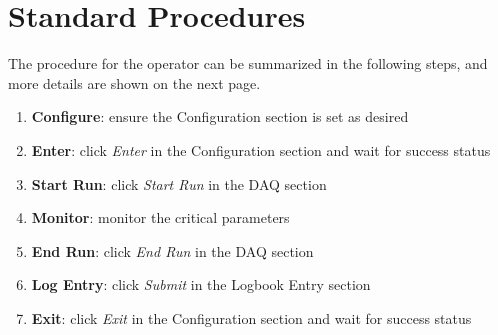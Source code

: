 \documentclass[amsmath,amssymb,notitlepage,11pt]{revtex4}
\begin{document}
\section{Standard Procedures}\label{sec:user}
The procedure for the operator can be summarized in the following steps, and more details are shown on the next page.
\begin{enumerate}
\vspace{-4mm}\item {\bf Configure}:  ensure the Configuration section is set as desired
\vspace{-4mm}\item {\bf Enter}: click {\em Enter} in the Configuration section and wait for success status
\vspace{-4mm}\item {\bf Start Run}: click {\em Start Run} in the DAQ section
\vspace{-4mm}\item {\bf Monitor}: monitor the critical parameters
\vspace{-4mm}\item {\bf End Run}: click {\em End Run} in the DAQ section
\vspace{-4mm}\item {\bf Log Entry}: click {\em Submit} in the Logbook Entry section 
\vspace{-4mm}\item {\bf Exit}: click {\em Exit} in the Configuration section and wait for success status
\end{enumerate}
\end{document}

